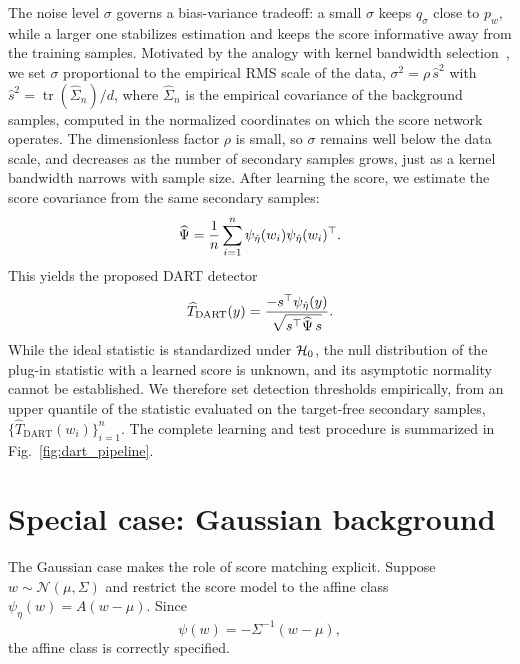 The noise level $\sigma$ governs a bias-variance tradeoff: a small $\sigma$ keeps $q_\sigma$ close to $p_w$, while a larger one stabilizes estimation and keeps the score informative away from the training samples.
Motivated by the analogy with kernel bandwidth selection~\cite{silverman1986density}, we set $\sigma$ proportional to the empirical RMS scale of the data, $\sigma^2 = \rho\,\hat{s}^2$ with $\hat{s}^2 = \operatorname{tr}(\widehat{\Sigma}_n)/d$, where $\widehat{\Sigma}_n$ is the empirical covariance of the background samples, computed in the normalized coordinates on which the score network operates.
The dimensionless factor $\rho$ is small, so $\sigma$ remains well below the data scale, and decreases as the number of secondary samples grows, just as a kernel bandwidth narrows with sample size.
After learning the score, we estimate the score covariance from the same secondary samples:
\begin{align}
    \widehat{\Psi}
    = \frac{1}{n}\sum_{i=1}^n
    \psi_{\hat\eta}(w_i)\psi_{\hat\eta}(w_i)^\top.
    \label{eq:psi_hat}
\end{align}
This yields the proposed DART detector
\begin{align}
    \widehat T_{\mathrm{DART}}(y)
    = \frac{-s^\top \psi_{\hat\eta}(y)}
    {\sqrt{s^\top \widehat{\Psi}\, s}}.
    \label{eq:lmp_plugin}
\end{align}
While the ideal statistic is standardized under $\mathcal{H}_0$, the null distribution of the plug-in statistic with a learned score is unknown, and its asymptotic normality cannot be established. We therefore set detection thresholds empirically, from an upper quantile of the statistic evaluated on the target-free secondary samples, $\{\widehat T_{\mathrm{DART}}(w_i)\}_{i=1}^n$.
The complete learning and test procedure is summarized in Fig.~\ref{fig:dart_pipeline}.



\section{Special case: Gaussian background}
\label{sec:special}

The Gaussian case makes the role of score matching explicit. Suppose
$
w \sim \mathcal{N}(\mu,\Sigma)
$
and restrict the score model to the affine class
$
\psi_\eta(w)=A(w-\mu).
$
Since
\begin{equation}
\psi(w)=-\Sigma^{-1}(w-\mu),
\end{equation}
the affine class is correctly specified.

